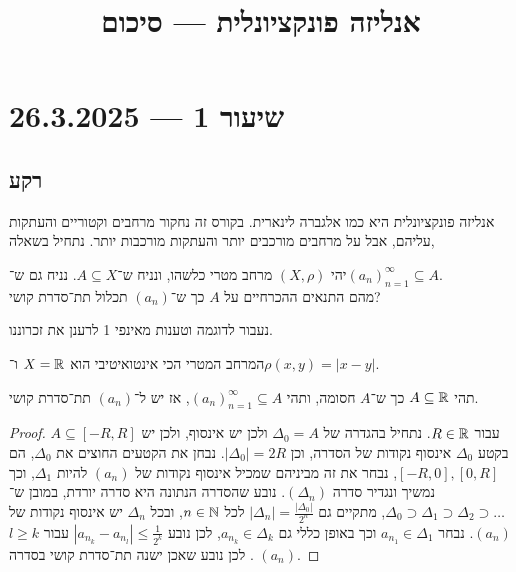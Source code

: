 
\title{אנליזה פונקציונלית --- סיכום}
\setcounter{secnumdepth}{2}

\usepackage{fancyhdr}
\pagestyle{fancy}
\renewcommand{\headrulewidth}{0pt}


\maketitle
\maketitleprint{}

\tableofcontents

\section{שיעור 1 --- 26.3.2025}
\subsection{רקע}
אנליזה פונקציונלית היא כמו אלגברה לינארית.
בקורס זה נחקור מרחבים וקטוריים והעתקות עליהם, אבל על מרחבים מורכבים יותר והעתקות מורכבות יותר.
נתחיל בשאלה,
\begin{exercise}
	יהי $(X, \rho)$ מרחב מטרי כלשהו, ונניח ש־$A \subseteq X$.
	נניח גם ש־${(a_n)}_{n = 1}^\infty \subseteq A$. \\
	מהם התנאים ההכרחיים על $A$ כך ש־$(a_n)$ תכלול תת־סדרת קושי?
\end{exercise}
נעבור לדוגמה וטענות מאינפי 1 לרענן את זכרוננו.
\begin{example}
	המרחב המטרי הכי אינטואיטיבי הוא $X = \mathbb{R}$ ו־$\rho(x, y) = |x - y|$.
\end{example}
\begin{proposition}
	תהי $A \subseteq \mathbb{R}$ כך ש־$A$ חסומה, ותהי ${(a_n)}_{n = 1}^\infty \subseteq A$,
	אז יש ל־$(a_n)$ תת־סדרת קושי.
\end{proposition}
\begin{proof}
	$A \subseteq [-R, R]$ עבור $R \in \mathbb{R}$.
	נתחיל בהגדרה של $\Delta_0 = A$ ולכן יש אינסוף, ולכן יש בקטע $\Delta_0$ אינסוף נקודות של הסדרה, וכן $|\Delta_0| = 2R$.
	נבחן את הקטעים החוצים את $\Delta_0$, הם $[-R, 0], [0, R]$, נבחר את זה מביניהם שמכיל אינסוף נקודות של $(a_n)$ להיות $\Delta_1$, וכך נמשיך ונגדיר סדרה $(\Delta_n)$.
	נובע שהסדרה הנתונה היא סדרה יורדת, במובן ש־$\Delta_0 \supset \Delta_1 \supset \Delta_2 \supset \dots$, מתקיים גם $|\Delta_n| = \frac{|\Delta_0|}{2^n}$ לכל $n \in \mathbb{N}$, ובכל $\Delta_n$ יש אינסוף נקודות של $(a_n)$.
	נבחר $a_{n_1} \in \Delta_1$ וכך באופן כללי גם $a_{n_k} \in \Delta_k$, לכן נובע $|a_{n_k} - a_{n_l}| \le \frac{1}{2^k}$ עבור $l \ge k$.
	לכן נובע שאכן ישנה תת־סדרת קושי בסדרה $(a_n)$.
\end{proof}
